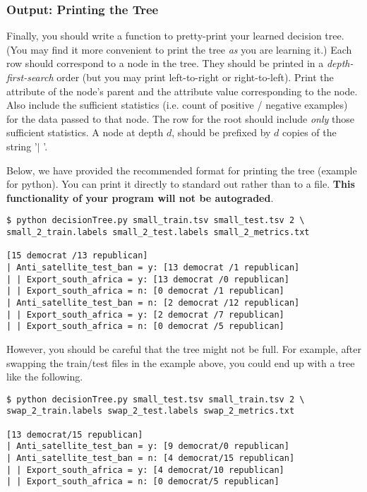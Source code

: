 \subsubsection{Output: Printing the Tree}
\label{sec:printtree}

Finally, you should write a function to pretty-print your learned decision tree. (You may find it more convenient to print the tree \emph{as} you are learning it.) Each row should correspond to a node in the tree. They should be printed in a \emph{depth-first-search} order (but you may print left-to-right or right-to-left). Print the attribute of the node's parent and the attribute value corresponding to the node. Also include the sufficient statistics (i.e. count of positive / negative examples) for the data passed to that node. The row for the root should include \emph{only} those sufficient statistics. A node at depth $d$, should be prefixed by $d$ copies of the string '$\mid$ '.

Below, we have provided the recommended format for printing the tree (example for python). You can print it directly to standard out rather than to a file. \textbf{This functionality of your program will not be autograded}.

\begin{lstlisting}[language=Shell]
$ python decisionTree.py small_train.tsv small_test.tsv 2 \ 
small_2_train.labels small_2_test.labels small_2_metrics.txt

[15 democrat /13 republican]
| Anti_satellite_test_ban = y: [13 democrat /1 republican]
| | Export_south_africa = y: [13 democrat /0 republican]
| | Export_south_africa = n: [0 democrat /1 republican]
| Anti_satellite_test_ban = n: [2 democrat /12 republican]
| | Export_south_africa = y: [2 democrat /7 republican]
| | Export_south_africa = n: [0 democrat /5 republican]
\end{lstlisting}

However, you should be careful that the tree might not be full. For example, after swapping the train/test files in the example above, you could end up with a tree like the following.

\begin{lstlisting}[language=Shell]
$ python decisionTree.py small_test.tsv small_train.tsv 2 \ 
swap_2_train.labels swap_2_test.labels swap_2_metrics.txt

[13 democrat/15 republican]
| Anti_satellite_test_ban = y: [9 democrat/0 republican]
| Anti_satellite_test_ban = n: [4 democrat/15 republican]
| | Export_south_africa = y: [4 democrat/10 republican]
| | Export_south_africa = n: [0 democrat/5 republican]
\end{lstlisting}

